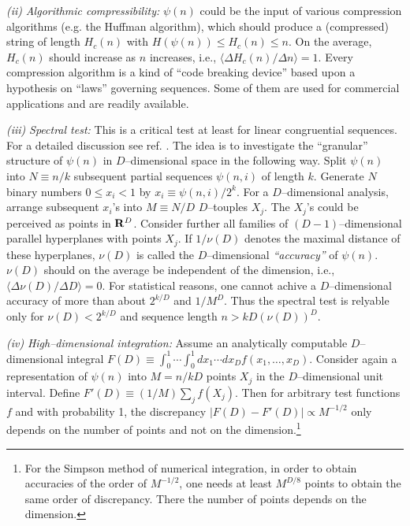  {\it (ii)} {\sl Algorithmic compressibility:}
 $\psi (n)$ could be the input of various compression algorithms (e.g.
 the Huffman algorithm), which should produce a (compressed) string of
 length $H_c(n)$ with $H(\psi (n))\le H_c(n)\le n$. On the average,
 $H_c(n)$ should increase
 as $n$ increases, i.e., $\langle {\Delta H_c(n)/ \Delta n
 }\rangle
 =1$. Every compression algorithm is a kind of ``code breaking device''
 based upon a hypothesis on ``laws'' governing sequences. Some of them
 are used for commercial applications and are readily available.

 {\it (iii)} {\sl Spectral test:}
 This is a critical test at least for linear congruential sequences.
 For a detailed discussion see ref. \cite{knuth1}. The idea is to
 investigate the ``granular'' structure of $\psi (n)$ in
 $D$--dimensional space in the following way.
 Split $\psi (n)$ into $N\equiv n/k$ subsequent partial sequences
 $\psi (n,i)$ of length $k$. Generate $N$ binary numbers $0\le x_i< 1$
 by $x_i\equiv \psi (n,i)/2^k$. For a $D$--dimensional analysis,
 arrange subsequent $x_i$'s into $M\equiv N/D$ $D$--touples $X_j$. The
 $X_j$'s could be perceived as points in ${\bf R}^D$.
 Consider further all families of $(D-1)$--dimensional parallel
 hyperplanes with points $X_j$.
 If $1/\nu (D)$ denotes the maximal distance of these hyperplanes, $\nu
 (D)$ is called the $D$--dimensional {\sl ``accuracy''} of $\psi (n)$.
 $\nu (D)$ should on the average be independent of the dimension, i.e.,
 $\langle {\Delta \nu (D)/\Delta D}\rangle=0$.
 For statistical reasons, one cannot achive a $D$--dimensional accuracy
 of more than about $2^{k/D}$ and $1/M^D$.
 Thus the spectral test is relyable only for $\nu (D)<2^{k/D}$ and
 sequence length $n>kD(\nu (D))^D$.

 {\it (iv)} {\sl High--dimensional integration:}
 Assume an analytically computable $D$--dimensional integral
 $F(D)\equiv \int_0^1\cdots \int_0^1 dx_1\cdots dx_D f(x_1,\ldots
 ,x_D)$.
 Consider again a representation of $\psi (n)$ into $M=n/kD$ points
 $X_j$ in the $D$--dimensional unit interval.
 Define $F'(D)\equiv (1/M)\sum_jf(X_j)$.
 Then for arbitrary test functions $f$ and with probability 1, the
 discrepancy $\vert F(D)-F'(D)\vert \propto M^{-1/2}$ only depends on
 the number of points and not on the dimension.\footnote{
 For the Simpson method of numerical integration, in order to obtain
 accuracies of the order of $M^{-1/2}$, one needs at least $M^{D/8}$
 points to obtain the same order of discrepancy. There the number of
 points depends on the dimension.}

